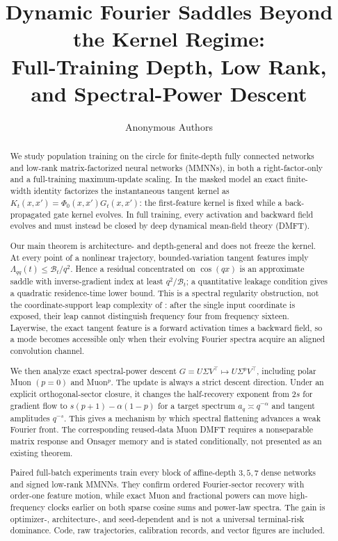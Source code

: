 \documentclass[11pt]{article}
\title{\bf Dynamic Fourier Saddles Beyond the Kernel Regime:\\
Full-Training Depth, Low Rank, and Spectral-Power Descent}
\author{Anonymous Authors}
\date{}
\newcommand{\1}{\mathbf 1}
\newcommand{\cB}{\mathcal B}
\theoremstyle{plain}
\theoremstyle{definition}
\begin{document}
\maketitle

\begin{abstract}
We study population training on the circle for finite-depth fully connected
networks and low-rank matrix-factorized neural networks (MMNNs), in both a
right-factor-only and a full-training maximum-update scaling.  In the masked
model an exact finite-width identity factorizes the instantaneous tangent
kernel as \(K_t(x,x')=\Phi_0(x,x')G_t(x,x')\): the first-feature kernel is
fixed while a back-propagated gate kernel evolves.  In full training, every
activation and backward field evolves and must instead be closed by deep
dynamical mean-field theory (DMFT).

Our main theorem is architecture- and depth-general and does not freeze the
kernel.  At every point of a nonlinear trajectory, bounded-variation tangent
features imply \(\Lambda_{qq}(t)\leq \cB_t/q^2\).  Hence a residual
concentrated on \(\cos(qx)\) is an approximate saddle with inverse-gradient
index at least \(q^2/\cB_t\); a quantitative leakage condition gives a
quadratic residence-time lower bound.  This is a spectral regularity
obstruction, not the coordinate-support leap complexity of
\citet{abbe2023leap}: after the single input coordinate is exposed, their
leap cannot distinguish frequency four from frequency sixteen.
Layerwise, the exact tangent feature is a forward activation times a
backward field, so a mode becomes accessible only when their evolving
Fourier spectra acquire an aligned convolution channel.

We then analyze exact spectral-power descent
\(G=U\Sigma V^\top\mapsto U\Sigma^pV^\top\), including polar Muon
\((p=0)\) and Muon\({}^p\).  The update is always a strict descent direction.
Under an explicit orthogonal-sector closure, it changes the half-recovery
exponent from \(2s\) for gradient flow to
\(s(p+1)-\alpha(1-p)\) for a target spectrum \(a_q\asymp q^{-\alpha}\)
and tangent amplitudes \(q^{-s}\).  This gives a mechanism by which spectral
flattening advances a weak Fourier front.  The corresponding reused-data
Muon DMFT requires a nonseparable matrix response and Onsager memory and is
stated conditionally, not presented as an existing theorem.

Paired full-batch experiments train every block of affine-depth
\(3,5,7\) dense networks and signed low-rank MMNNs.  They confirm ordered
Fourier-sector recovery with order-one feature motion, while exact Muon and
fractional powers can move high-frequency clocks earlier on both sparse
cosine sums and power-law spectra.  The gain is optimizer-, architecture-,
and seed-dependent and is not a universal terminal-risk dominance.  Code,
raw trajectories, calibration records, and vector figures are included.
\end{abstract}
\end{document}
